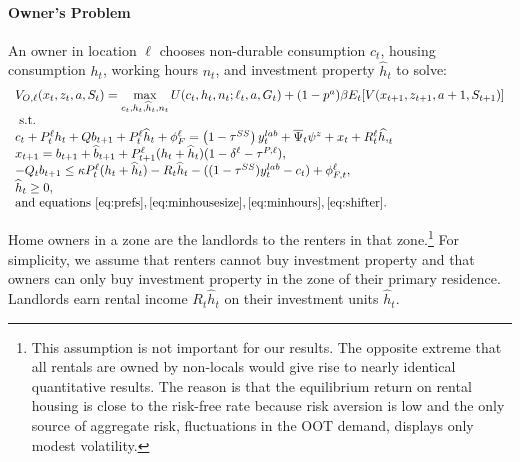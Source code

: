 \documentclass[letterpaper,12pt,dvipsnames,usenames]{article}
\theoremstyle{definition}
\begin{document}
\begin{spacing}{1.25}
\paragraph{Owner's Problem}
An owner in location $\ell$ chooses non-durable consumption $c_{t}$, housing consumption $h_{t}$, working hours $n_{t}$, and investment property $\widehat{h}_{t}$ to solve:
\begin{equation*}
\begin{array}{l}
V_{O,\ell}(x_{t},z_{t},a,S_{t})=\max\limits_{c_{t},h_{t},\widehat{h}_{t},n_{t}}U(c_{t},h_{t},n_{t};\ell_{t},a,G_{t})+(1-p^{a})\beta E_{t}[V(x_{t+1},z_{t+1},a+1,S_{t+1})] \\\text{  s.t. }\\
c_{t}+P^{\ell}_t h_{t} + Q b_{t+1}+ P^{\ell}_{t}\widehat{h}_{t}+\phi^{\ell}_{F}
=\left(1-\tau^{SS}\right)y_t^{lab} + \overline{\Psi}_t\psi^{z}+x_{t} + R^{\ell}_{t}\widehat{h,}_{t}\\
x_{t+1}=b_{t+1}+\widehat{b}_{t+1}+P^{\ell}_{t+1}(h_{t}+\widehat{h}_{t})(1-\delta^{\ell}-\tau^{P,\ell}),\\ %
-Q_{t}b_{t+1} \le  \kappa P^{\ell}_{t}(h_{t}+\widehat{h}_{t})-R_{t}\widehat{h}_{t} - ((1-\tau^{SS})y_t^{lab}-c_t)+\phi^{\ell}_{F,t},
 \\
\widehat{h}_{t} \ge 0,\\
\text{and equations } \eqref{eq:prefs}, \eqref{eq:minhousesize}, \eqref{eq:minhours}, \eqref{eq:shifter}.
\end{array}
\end{equation*}

Home owners in a zone are the landlords to the renters in that zone.\footnote{This assumption is not important for our results. The opposite extreme that all rentals are owned by non-locals would give rise to nearly identical quantitative results. The reason is that the equilibrium return on rental housing is close to the risk-free rate because risk aversion is low and the only source of aggregate risk, fluctuations in the OOT demand, displays only modest volatility.} For simplicity, we assume that renters cannot buy investment property and that owners can only buy investment property in the zone of their primary residence. Landlords earn rental income $R^{}_{t}\widehat{h}_{t}$ on their investment units $\widehat{h}_{t}$.


\end{spacing}
\end{document}
